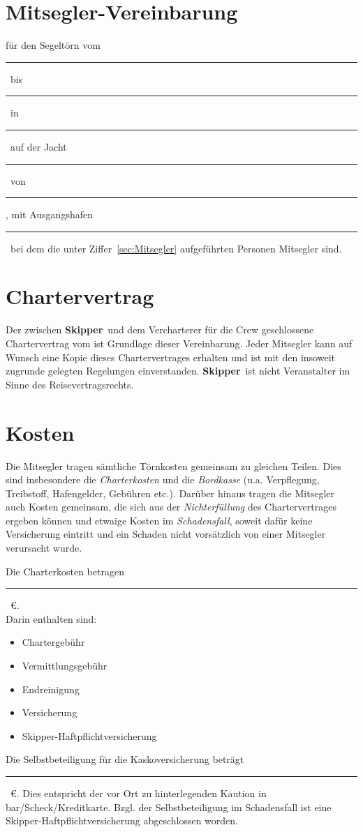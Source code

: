 \documentclass[a4paper,12pt]{article}
\newcommand{\openlength}[1]{\rule{#1}{.4pt}}
\newcommand{\openeuro}{\openlength{2cm}~\euro}
\newcommand{\open}{\openlength{3cm}}
\newcommand{\skipper}{\textbf{Skipper}}
\newcommand{\departdate}{\open}
\newcommand{\returndate}{\open}
\newcommand{\location}{\open}
\newcommand{\boatname}{\open}
\newcommand{\charteree}{\open}
\newcommand{\harbour}{\open}
\begin{document}
\section*{Mitsegler-Vereinbarung}

für den Segeltörn vom \departdate\ bis \returndate\ in \location\ auf der Jacht \boatname\ von \charteree, mit Ausgangshafen \harbour\ bei dem die unter Ziffer~\ref{sec:Mitsegler} aufgeführten Personen Mitsegler sind.


\section{Chartervertrag}
\label{sec:Chartervertrag}

Der zwischen \skipper\ und dem Vercharterer für die Crew geschlossene Chartervertrag vom ist Grundlage dieser Vereinbarung.
Jeder Mitsegler kann auf Wunsch eine Kopie dieses Chartervertrages erhalten und ist mit den insoweit zugrunde gelegten Regelungen einverstanden.
\skipper\ ist nicht Veranstalter im Sinne des Reisevertragsrechts.


\section{Kosten}
\label{sec:Kosten}

Die Mitsegler tragen sämtliche Törnkosten gemeinsam zu gleichen Teilen.
Dies sind insbesondere die \textit{Charterkosten} und die \textit{Bordkasse} (u.a. Verpflegung, Treibstoff, Hafengelder, Gebühren etc.).
Darüber hinaus tragen die Mitsegler auch Kosten gemeinsam, die sich aus der \textit{Nichterfüllung} des Chartervertrages ergeben können und etwaige Kosten im \textit{Schadensfall}, soweit dafür keine Versicherung eintritt und ein Schaden nicht vorsätzlich von einer Mitsegler verursacht wurde.


Die Charterkosten betragen \openeuro.\\
Darin enthalten sind:
\begin{itemize}
	\item Chartergebühr
	\item Vermittlungsgebühr
	\item Endreinigung
	\item Versicherung
	\item Skipper-Haftpflichtversicherung
\end{itemize}

Die Selbstbeteiligung für die Kaskoversicherung beträgt \openeuro.
Dies entspricht der vor Ort zu hinterlegenden Kaution in bar/Scheck/Kreditkarte.
Bzgl. der Selbstbeteiligung im Schadensfall ist eine Skipper-Haftpflichtversicherung abgeschlossen worden.
\end{document}
